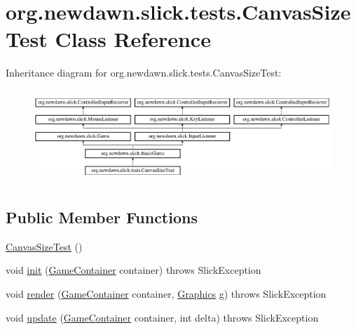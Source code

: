 \hypertarget{classorg_1_1newdawn_1_1slick_1_1tests_1_1_canvas_size_test}{}\section{org.\+newdawn.\+slick.\+tests.\+Canvas\+Size\+Test Class Reference}
\label{classorg_1_1newdawn_1_1slick_1_1tests_1_1_canvas_size_test}
Inheritance diagram for org.\+newdawn.\+slick.\+tests.\+Canvas\+Size\+Test\+:\begin{figure}[H]
\begin{center}
\leavevmode
\includegraphics[height=3.522012cm]{classorg_1_1newdawn_1_1slick_1_1tests_1_1_canvas_size_test}
\end{center}
\end{figure}
\subsection*{Public Member Functions}
\begin{DoxyCompactItemize}
\item 
\mbox{\hyperlink{classorg_1_1newdawn_1_1slick_1_1tests_1_1_canvas_size_test_a2c4dfef634aa9600288b5c47120c83f7}{Canvas\+Size\+Test}} ()
\item 
void \mbox{\hyperlink{classorg_1_1newdawn_1_1slick_1_1tests_1_1_canvas_size_test_adb93eb9115df42cdb26ddbc76c8bd4cb}{init}} (\mbox{\hyperlink{classorg_1_1newdawn_1_1slick_1_1_game_container}{Game\+Container}} container)  throws Slick\+Exception 
\item 
void \mbox{\hyperlink{classorg_1_1newdawn_1_1slick_1_1tests_1_1_canvas_size_test_a11b37e926c399dee2d9297bc036dfbfa}{render}} (\mbox{\hyperlink{classorg_1_1newdawn_1_1slick_1_1_game_container}{Game\+Container}} container, \mbox{\hyperlink{classorg_1_1newdawn_1_1slick_1_1_graphics}{Graphics}} g)  throws Slick\+Exception 
\item 
void \mbox{\hyperlink{classorg_1_1newdawn_1_1slick_1_1tests_1_1_canvas_size_test_ab00762233a897ffdf02d373e8ecb9ad5}{update}} (\mbox{\hyperlink{classorg_1_1newdawn_1_1slick_1_1_game_container}{Game\+Container}} container, int delta)  throws Slick\+Exception 
\end{DoxyCompactItemize}
